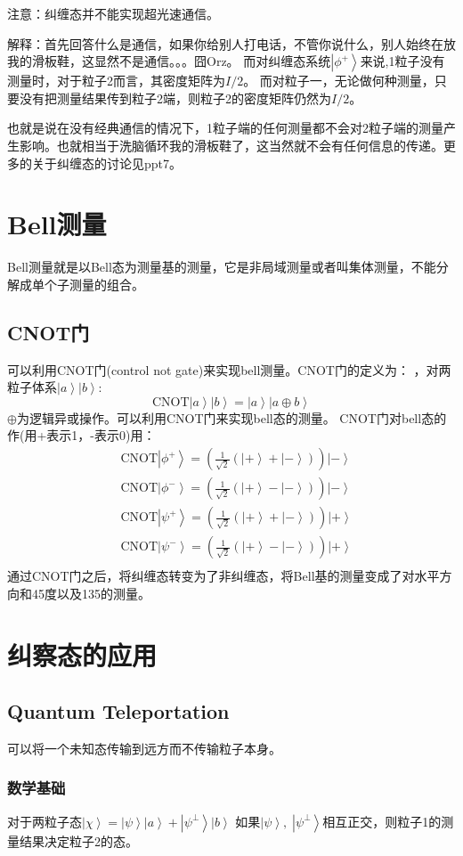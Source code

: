 \documentclass[10pt,a4paper,nocap]{ctexart}
\newcommand{\ket}[1]{\left|#1\right>}
\begin{document}
注意：纠缠态并不能实现超光速通信。

解释：首先回答什么是通信，如果你给别人打电话，不管你说什么，别人始终在放我的滑板鞋，这显然不是通信。。。囧Orz。
而对纠缠态系统\(\ket{\phi^+}\)来说,1粒子没有测量时，对于粒子2而言，其密度矩阵为\(I/2\)。 而对粒子一，无论做何种测量，只要没有把测量结果传到粒子2端，则粒子2的密度矩阵仍然为\(I/2\)。

也就是说在没有经典通信的情况下，1粒子端的任何测量都不会对2粒子端的测量产生影响。也就相当于洗脑循环我的滑板鞋了，这当然就不会有任何信息的传递。更多的关于纠缠态的讨论见ppt7。
\section{Bell测量}
Bell测量就是以Bell态为测量基的测量，它是非局域测量或者叫集体测量，不能分解成单个子测量的组合。
\subsection{CNOT门}
可以利用CNOT门(control not gate)来实现bell测量。CNOT门的定义为： ，对两粒子体系\(\ket{a}\ket{b}\):\[\mathrm{CNOT}\ket{a}\ket{b} = \ket{a}\ket{a\oplus b}\]
\(\oplus\)为逻辑异或操作。可以利用CNOT门来实现bell态的测量。
CNOT门对bell态的作(用+表示1，-表示0)用：
\begin{equation}
\begin{split}
&\mathrm{CNOT}\ket{\phi^+} = (\frac{1}{\sqrt{2}}(\ket{+}+\ket{-}))\ket{-}\\
&\mathrm{CNOT}\ket{\phi^-} =  (\frac{1}{\sqrt{2}}(\ket{+}-\ket{-}))\ket{-}\\
&\mathrm{CNOT}\ket{\psi^+} =  (\frac{1}{\sqrt{2}}(\ket{+}+\ket{-}))\ket{+}\\
& \mathrm{CNOT}\ket{\psi^-} = (\frac{1}{\sqrt{2}}(\ket{+}-\ket{-}))\ket{+}\\
\end{split}
\end{equation}
通过CNOT门之后，将纠缠态转变为了非纠缠态，将Bell基的测量变成了对水平方向和45\textdegree 度以及135\textdegree 的测量。
\section{纠察态的应用}
\subsection{Quantum Teleportation}
可以将一个未知态传输到远方而不传输粒子本身。
\subsubsection{ 数学基础}
对于两粒子态\(\ket{\chi} = \ket{\psi}\ket{a} + \ket{\psi^\perp}\ket{b}\)
如果\(\ket{\psi} ,\; \ket{\psi^\perp}\)相互正交，则粒子1的测量结果决定粒子2的态。
\end{document}
